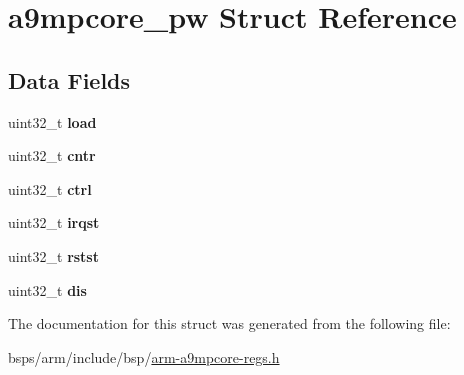 \hypertarget{structa9mpcore__pw}{}\section{a9mpcore\+\_\+pw Struct Reference}
\label{structa9mpcore__pw}
\subsection*{Data Fields}
\begin{DoxyCompactItemize}
\item 
\mbox{\label{structa9mpcore__pw_a46f3a8da213c1081a0ffab5dc8ea52f8}} 
uint32\+\_\+t {\bfseries load}
\item 
\mbox{\label{structa9mpcore__pw_a7e724e1e8a039e259fb1c8ac1a076bb2}} 
uint32\+\_\+t {\bfseries cntr}
\item 
\mbox{\label{structa9mpcore__pw_a4fb3e406f0fb92f85c303bcc3079771c}} 
uint32\+\_\+t {\bfseries ctrl}
\item 
\mbox{\label{structa9mpcore__pw_a321fda63470d878dd2b64620fb22552e}} 
uint32\+\_\+t {\bfseries irqst}
\item 
\mbox{\label{structa9mpcore__pw_a959b2d3327b4df591c797d812f04f258}} 
uint32\+\_\+t {\bfseries rstst}
\item 
\mbox{\label{structa9mpcore__pw_a67941411ba62bf746a6642f83d67344c}} 
uint32\+\_\+t {\bfseries dis}
\end{DoxyCompactItemize}


The documentation for this struct was generated from the following file\+:\begin{DoxyCompactItemize}
\item 
bsps/arm/include/bsp/\mbox{\hyperlink{arm-a9mpcore-regs_8h}{arm-\/a9mpcore-\/regs.\+h}}\end{DoxyCompactItemize}
